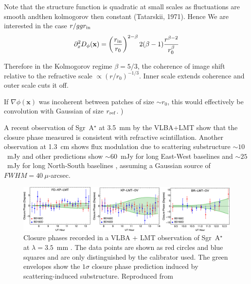 Note that the structure function is quadratic at small scales as fluctuations are smooth andthen kolmogorov then constant (Tatarskii, 1971).
Hence We are interested in the case $r /gg r_{\rm in}$
\begin{equation}
\partial_x^2 D_\phi(\mathbf{x})= \left(\frac{r_{\rm in}}{r_0}\right)^{2-\beta}  2(\beta -1)  \frac{r^{\beta-2}}{r_0^\beta}
\end{equation}

Therefore in the Kolmogorov regime $\beta = 5/3$, the coherence of image shift relative to the refractive scale $\propto (r/r_0)^{-1/3}$. Inner scale extends coherence and outer scale cuts it off.


If $\nabla \phi(\mathbf{x})$ was incoherent between patches of size $\sim r_0$, this would effectively be convolution with Gaussian of size $r_{\rm ref}$. 
)


A recent observation of Sgr~A$^\star$ at 3.5~mm by the VLBA+LMT \citep[see Fig.~ref{fig:substructure2}][]{Ortiz_2016} show that the closure phase measured is consistent with refractive scintillation. Another observation at 1.3~cm shows flux modulation due to scattering substructure $\sim 10$~mJy \citep{Gwinn_2014} and other predictions show $\sim 60$~mJy for long East-West baselines and $\sim 25$~mJy for long North-South baselines \citep*{Johnson_2015a}, assuming a Gaussian source of $FWHM=40\ \mu$-arcsec.

\begin{figure}
\begin{center}
\includegraphics[width=\columnwidth]{Images/ism_cp}
\caption{Closure phases recorded in a VLBA + LMT observation of  Sgr~A$^\star$ at $\lambda = 3.5$~mm \cite{Ortiz_2016}. The data points are shown as red circles and blue squares and are only distinguished by the calibrator used. The green envelopes show the $1\sigma$ closure phase prediction induced by scattering-induced substructure. Reproduced from \citet{Ortiz_2016} \label{fig:substructure2}
}
\end{center}
\end{figure}


